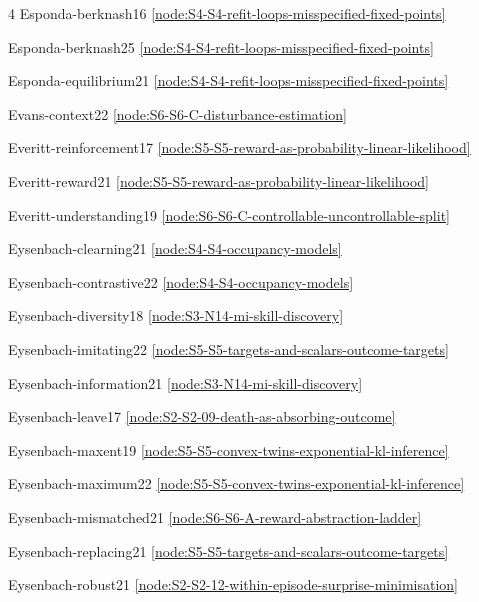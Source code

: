 \documentclass[10pt]{article}
\begin{document}
{\begin{multicols}{4}
Esponda-berknash16 \hfill \ref{node:S4-S4-refit-loops-misspecified-fixed-points}\par
Esponda-berknash25 \hfill \ref{node:S4-S4-refit-loops-misspecified-fixed-points}\par
Esponda-equilibrium21 \hfill \ref{node:S4-S4-refit-loops-misspecified-fixed-points}\par
Evans-context22 \hfill \ref{node:S6-S6-C-disturbance-estimation}\par
Everitt-reinforcement17 \hfill \ref{node:S5-S5-reward-as-probability-linear-likelihood}\par
Everitt-reward21 \hfill \ref{node:S5-S5-reward-as-probability-linear-likelihood}\par
Everitt-understanding19 \hfill \ref{node:S6-S6-C-controllable-uncontrollable-split}\par
Eysenbach-clearning21 \hfill \ref{node:S4-S4-occupancy-models}\par
Eysenbach-contrastive22 \hfill \ref{node:S4-S4-occupancy-models}\par
Eysenbach-diversity18 \hfill \ref{node:S3-N14-mi-skill-discovery}\par
Eysenbach-imitating22 \hfill \ref{node:S5-S5-targets-and-scalars-outcome-targets}\par
Eysenbach-information21 \hfill \ref{node:S3-N14-mi-skill-discovery}\par
Eysenbach-leave17 \hfill \ref{node:S2-S2-09-death-as-absorbing-outcome}\par
Eysenbach-maxent19 \hfill \ref{node:S5-S5-convex-twins-exponential-kl-inference}\par
Eysenbach-maximum22 \hfill \ref{node:S5-S5-convex-twins-exponential-kl-inference}\par
Eysenbach-mismatched21 \hfill \ref{node:S6-S6-A-reward-abstraction-ladder}\par
Eysenbach-replacing21 \hfill \ref{node:S5-S5-targets-and-scalars-outcome-targets}\par
Eysenbach-robust21 \hfill \ref{node:S2-S2-12-within-episode-surprise-minimisation}\par


\end{multicols}}
\end{document}

